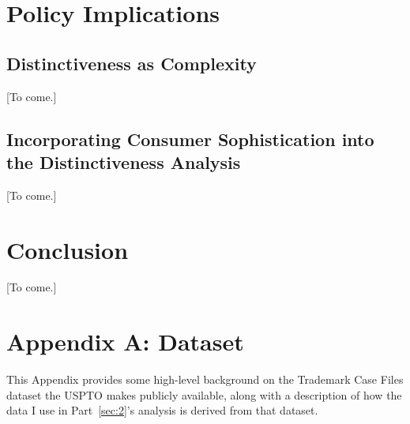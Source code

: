 \documentclass[letterpaper, 11pt, oneside]{article}
\begin{document}
\section{Policy Implications} \label{sec:3}

\subsection{Distinctiveness as Complexity}\label{subsec:3A}

[To come.]

\subsection{Incorporating Consumer Sophistication into the Distinctiveness Analysis}\label{subsec:3B}

[To come.]

\section*{Conclusion}

[To come.]

\newpage

\appendix
{}
\section*{Appendix A: Dataset}

This Appendix provides some high-level background on the Trademark Case Files dataset the USPTO makes publicly available, along with a description of how the data I use in Part~\ref{sec:2}'s analysis is derived from that dataset.
\end{document}
